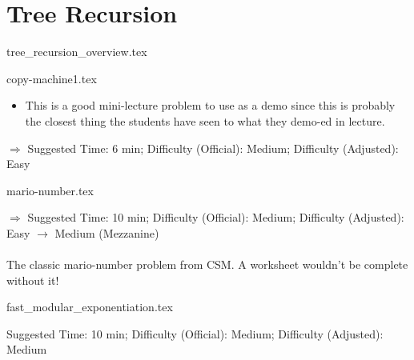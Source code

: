 \documentclass{exam}
\begin{document}
\section{Tree Recursion}
{tree_recursion_overview.tex}
\begin{questions}
    {copy-machine1.tex}
    \begin{questionmeta}
        \begin{itemize}
            \item This is a good mini-lecture problem to use as a demo since this is probably the closest thing the students have seen to what they demo-ed in lecture.
        \end{itemize}
        $\Rightarrow$ Suggested Time: 6 min; Difficulty (Official): Medium; Difficulty (Adjusted): Easy
    \end{questionmeta}

    {mario-number.tex}
    \begin{questionmeta}
        $\Rightarrow$ Suggested Time: 10 min; Difficulty (Official): Medium; Difficulty (Adjusted): Easy $\rightarrow$ Medium (Mezzanine) \\ \\
        The classic mario-number problem from CSM. A worksheet wouldn't be complete without it!
    \end{questionmeta}

    {fast_modular_exponentiation.tex}
    \begin{questionmeta}
        Suggested Time: 10 min; Difficulty (Official): Medium; Difficulty (Adjusted): Medium
    \end{questionmeta}

\end{questions}
\end{document}
